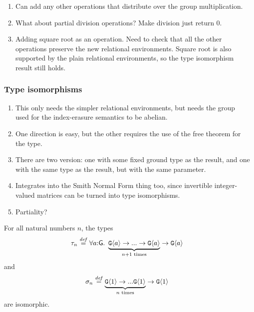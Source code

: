 \begin{enumerate}
\item Can add any other operations that distribute over the group
  multiplication.
\item What about partial division operations? Make division just
  return $0$.
\item Adding square root as an operation. Need to check that all the
  other operations preserve the new relational environments. Square
  root is also supported by the plain relational environments, so the
  type isomorphism result still holds.
\end{enumerate}



\subsubsection{Type isomorphisms}
\label{sec:abelian-group-type-isos}

\begin{enumerate}
\item This only needs the simpler relational environments, but needs
  the group used for the index-erasure semantics to be abelian.
\item One direction is easy, but the other requires the use of the
  free theorem for the type.
\item There are two version: one with some fixed ground type as the
  result, and one with the same type as the result, but with the same
  parameter.
\item Integrates into the Smith Normal Form thing too, since
  invertible integer-valued matrices can be turned into type
  isomorphisms.
\item Partiality?
\end{enumerate}


\begin{theorem}
  For all natural numbers $n$, the types
  \begin{displaymath}
    \tau_{n} \stackrel{\mathit{def}}= \forall a\mathord:\mathsf{G}.\ \underbrace{\textup{\texttt{G}}\langle a \rangle \to ... \to \textup{\texttt{G}}\langle a \rangle}_{n+1\textrm{ times}} \to \textup{\texttt{G}}\langle a \rangle
  \end{displaymath}
  and
  \begin{displaymath}
    \sigma_{n} \stackrel{\mathit{def}}= \underbrace{\textup{\texttt{G}}\langle 1 \rangle \to ... \textup{\texttt{G}}\langle 1 \rangle}_{n\textrm{ times}} \to \textup{\texttt{G}}\langle 1 \rangle
  \end{displaymath}
  are isomorphic.
\end{theorem}

